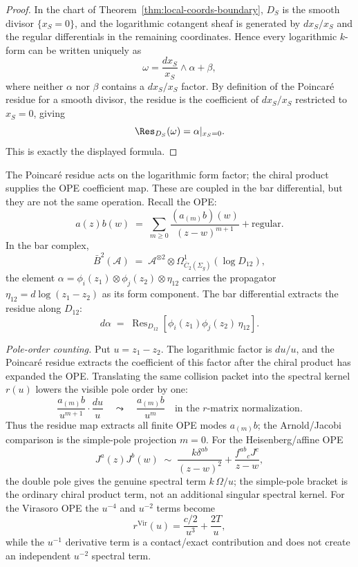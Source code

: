 \begin{proof}
In the chart of Theorem~\ref{thm:local-coords-boundary}, $D_S$ is the smooth
divisor $\{x_S=0\}$, and the logarithmic cotangent sheaf is generated by
$dx_S/x_S$ and the regular differentials in the remaining
coordinates. Hence every logarithmic $k$-form can be written uniquely as
\[
\omega=\frac{dx_S}{x_S}\wedge\alpha+\beta,
\]
where neither $\alpha$ nor $\beta$ contains a $dx_S/x_S$ factor.
By definition of the Poincar\'e residue for a smooth divisor, the residue is the
coefficient of $dx_S/x_S$ restricted to $x_S=0$, giving
\[
\Res_{D_S}(\omega)=\alpha|_{x_S=0}.
\]
This is exactly the displayed formula.
\end{proof}

\begin{remark}
\label{rem:residues-and-ope}
\label{rem:bar-pole-absorption}
The Poincar\'e residue acts on the logarithmic form factor; the chiral
product supplies the OPE coefficient map. These are coupled in the bar
differential, but they are not the same operation. Recall the OPE:
\[
a(z)b(w)
\;=\;
\sum_{m\geq 0}\frac{(a_{(m)}b)(w)}{(z-w)^{m+1}}
+ \text{regular}.
\]
In the bar complex,
\[
\bar{B}^2(\mathcal{A}) \;=\; \mathcal{A}^{\otimes 2}
\otimes \Omega^1_{\overline{C}_2(\Sigma_g)}(\log D_{12}),
\]
the element $\alpha = \phi_i(z_1)\otimes\phi_j(z_2)\otimes \eta_{12}$
carries the propagator $\eta_{12} = d\log(z_1-z_2)$ as its form
component. The bar differential extracts the residue along $D_{12}$:
\[
d\alpha
\;=\;
\operatorname{Res}_{D_{12}}\!\left[\phi_i(z_1)\phi_j(z_2)\,\eta_{12}\right].
\]

\emph{Pole-order counting.} Put $u=z_1-z_2$. The logarithmic factor is
$du/u$, and the Poincar\'e residue extracts the coefficient of this
factor after the chiral product has expanded the OPE. Translating the
same collision packet into the spectral kernel $r(u)$ lowers the visible
pole order by one:
\[
\frac{a_{(m)}b}{u^{m+1}}\cdot \frac{du}{u}
\quad\leadsto\quad
\frac{a_{(m)}b}{u^m}
\quad\text{in the } r\text{-matrix normalization}.
\]
Thus the residue map extracts all finite OPE modes $a_{(m)}b$; the
Arnold/Jacobi comparison is the simple-pole projection $m=0$.
For the Heisenberg/affine OPE
\[
J^a(z)J^b(w) \;\sim\; \frac{k\delta^{ab}}{(z-w)^2} + \frac{f^{ab}{}_c J^c}{z-w},
\]
the double pole gives the genuine spectral term $k\,\Omega/u$; the
simple-pole bracket is the ordinary chiral product term, not an
additional singular spectral kernel. For the Virasoro OPE the
$u^{-4}$ and $u^{-2}$ terms become
\[
r^{\mathrm{Vir}}(u)=\frac{c/2}{u^3}+\frac{2T}{u},
\]
while the $u^{-1}$ derivative term is a contact/exact contribution and
does not create an independent $u^{-2}$ spectral term.
\end{remark}

